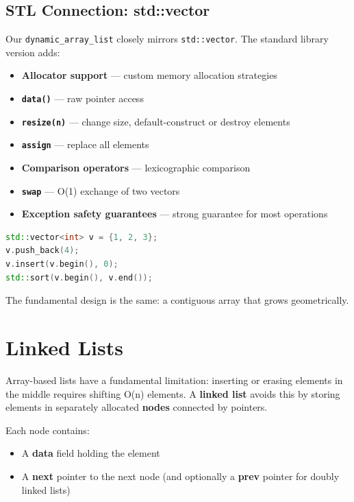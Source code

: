 \subsection{STL Connection: std::vector}

Our \texttt{dynamic\_array\_list} closely mirrors \texttt{std::vector}. The standard library version adds:
\begin{itemize}
\item \textbf{Allocator support} — custom memory allocation strategies
\item \textbf{\texttt{data()}} — raw pointer access
\item \textbf{\texttt{resize(n)}} — change size, default-construct or destroy elements
\item \textbf{\texttt{assign}} — replace all elements
\item \textbf{Comparison operators} — lexicographic comparison
\item \textbf{\texttt{swap}} — O(1) exchange of two vectors
\item \textbf{Exception safety guarantees} — strong guarantee for most operations
\end{itemize}

\begin{lstlisting}[language=C++]
std::vector<int> v = {1, 2, 3};
v.push_back(4);
v.insert(v.begin(), 0);
std::sort(v.begin(), v.end());
\end{lstlisting}

The fundamental design is the same: a contiguous array that grows geometrically.

\bigskip

\section{Linked Lists}

Array-based lists have a fundamental limitation: inserting or erasing elements in the middle requires shifting O(n) elements. A \textbf{linked list} avoids this by storing elements in separately allocated \textbf{nodes} connected by pointers.

Each node contains:
\begin{itemize}
\item A \textbf{data} field holding the element
\item A \textbf{next} pointer to the next node (and optionally a \textbf{prev} pointer for doubly linked lists)
\end{itemize}

